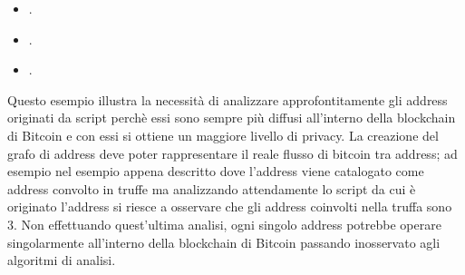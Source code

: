 \begin{example}
    \begin{itemize}
      \item {}.
      \item {}.
      \item {}.
    \end{itemize}

    Questo esempio illustra la necessità di analizzare approfontitamente gli address originati da script perchè essi sono sempre più diffusi all'interno della blockchain di Bitcoin e con essi si ottiene un maggiore livello di privacy.
    La creazione del grafo di address deve poter rappresentare il reale flusso di bitcoin tra address; ad esempio nel esempio appena descritto dove l'address   viene catalogato come address convolto in truffe ma analizzando attendamente lo script da cui è originato l'address si riesce a osservare che gli address coinvolti nella truffa sono 3.
    Non effettuando quest'ultima analisi, ogni singolo address potrebbe operare singolarmente all'interno della blockchain di Bitcoin passando inosservato agli algoritmi di analisi.
 \end{example}

